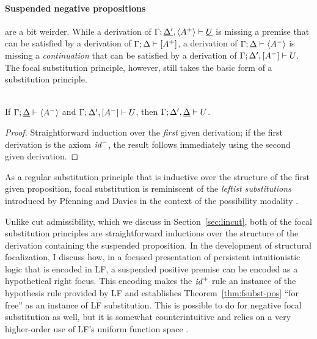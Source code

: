 \paragraph{Suspended negative propositions} are a bit weirder. While a derivation
of ${\Gamma};{\underline{\Delta'}, \langle A^+ \rangle} \vdash {\underline{U}} \mathstrut$
is missing a premise that can be satisfied by a derivation of
${\Gamma};{\Delta} \vdash {[A^+]} \mathstrut$, a derivation of 
${\Gamma};{\underline{\Delta}} \vdash {\langle A^- \rangle} \mathstrut$ is missing a 
{\it continuation} that can be satisfied by a derivation of
${\Gamma};{\Delta', [A^-]} \vdash {U} \mathstrut$. The focal substitution principle,
however, still takes the basic form of a substitution principle.

\bigskip
\begin{theorem}\label{thm:fsubst-neg}~\\
If ${\Gamma};{\underline{\Delta}} \vdash {\langle A^- \rangle} \mathstrut$
and ${\Gamma};{\Delta', [A^-]} \vdash {U} \mathstrut$, 
then ${\Gamma};{\Delta', \underline{\Delta}} \vdash {U} \mathstrut$. 
\end{theorem}

\begin{proof}
  Straightforward induction over the {\it first} given derivation; if
  the first derivation is the axiom ${\it id}^-$, the result follows
  immediately using the second given derivation.
\end{proof}

\noindent
As a regular substitution principle that is inductive over the structure
of the first given proposition, focal substitution is reminiscent of 
the {\it leftist substitutions} introduced by Pfenning and Davies in the 
context of the possibility modality \cite{pfenning01judgmental}.

Unlike cut admissibility, which we discuss in
Section~\ref{sec:lincut}, both of the focal substitution principles
are straightforward inductions over the structure of the derivation
containing the suspended proposition. In the development of structural
focalization, I discuss how, in a focused presentation of persistent
intuitionistic logic that is encoded in LF, a suspended positive
premise can be encoded as a hypothetical right focus. This encoding
makes the ${\it id}^+$ rule an instance of the hypothesis rule
provided by LF and establishes Theorem~\ref{thm:fsubst-pos} ``for
free'' as an instance of LF substitution. This is possible to do for
negative focal substitution as well, but it is somewhat
counterintuitive and relies on a very higher-order use of LF's uniform
function space \cite{simmons11structural}.

